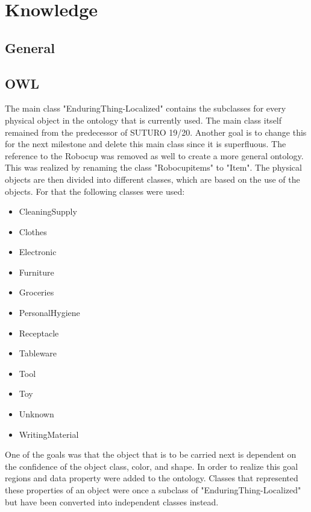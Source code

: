 \documentclass[main.tex]{subfiles}
\begin{document}
	
	\chapter{Knowledge}
		\section{General}
				


		\section{OWL}
		The main class "EnduringThing-Localized" contains the subclasses for every physical object in the ontology that is currently used. The main class itself remained from the predecessor of SUTURO 19/20. Another goal is to change this for the next milestone and delete this main class since it is superfluous.
The reference to the Robocup was removed as well to create a more general ontology. This was realized by renaming the class "Robocupitems" to "Item". The physical objects are then divided into different classes, which are based on the use of the objects. For that the following classes were used:
		
		\begin{itemize}
		\item CleaningSupply
		\item Clothes
		\item Electronic
		\item Furniture
		\item Groceries
		\item PersonalHygiene
		\item Receptacle
		\item Tableware
		\item Tool
		\item Toy
		\item Unknown
		\item WritingMaterial
		\end{itemize}
		
		One of the goals was that the object that is to be carried next is dependent on the confidence of the object class, color, and shape. In order to realize this goal regions and data property were added to the ontology. Classes that represented these properties of an object were once a subclass of "EnduringThing-Localized" but have been converted into independent classes instead.  
\end{document}
